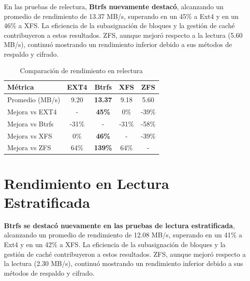 En las pruebas de relectura, \textbf{Btrfs nuevamente destacó}, alcanzando un promedio de rendimiento de 13.37 MB/s, superando en un 45\% a Ext4 y en un 46\% a XFS. La eficiencia de la subasignación de bloques y la gestión de caché contribuyeron a estos resultados. ZFS, aunque mejoró respecto a la lectura (5.60 MB/s), continuó mostrando un rendimiento inferior debido a sus métodos de respaldo y cifrado.

\begin{table}[h!]
\centering
\caption{Comparación de rendimiento en relectura}
\begin{tabular}{|l|c|c|c|c|}
\hline
\textbf{Métrica} & \textbf{EXT4} & \textbf{Btrfs} & \textbf{XFS} & \textbf{ZFS} \\ \hline
Promedio (MB/s)   & 9.20          & \textbf{13.37} & 9.18         & 5.60         \\ \hline
Mejora vs EXT4    & -             & \textbf{45\%}  & 0\%          & -39\%        \\ \hline
Mejora vs Btrfs   & -31\%         & -              & -31\%        & -58\%        \\ \hline
Mejora vs XFS     & 0\%           & \textbf{46\%}  & -            & -39\%        \\ \hline
Mejora vs ZFS     & 64\%          & \textbf{139\%} & 64\%         & -            \\ \hline
\end{tabular}
\end{table}

\section{Rendimiento en Lectura Estratificada}

\textbf{Btrfs se destacó nuevamente en las pruebas de lectura estratificada}, alcanzando un promedio de rendimiento de 12.08 MB/s, superando en un 41\% a Ext4 y en un 42\% a XFS. La eficiencia de la subasignación de bloques y la gestión de caché contribuyeron a estos resultados. ZFS, aunque mejoró respecto a la lectura (2.30 MB/s), continuó mostrando un rendimiento inferior debido a sus métodos de respaldo y cifrado.

